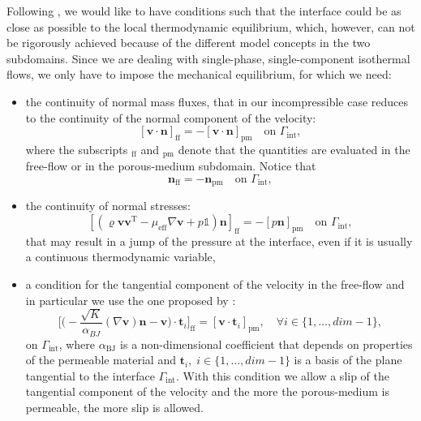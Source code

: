 Following \textcite{paper:mosthaf}, we would like to have conditions such that 
the interface could be as close as possible to the local thermodynamic 
equilibrium, which, however, can not be rigorously achieved because of the 
different model concepts in the two subdomains. Since we are dealing with 
single-phase, single-component isothermal flows, we only have to impose the 
mechanical equilibrium, for which we need:
\begin{itemize}
	\item the continuity of normal mass fluxes, that in our incompressible case 
	reduces to the continuity of the normal component of the velocity:
	\begin{equation} \label{eq:contmass}
		[\mathbf{v} \cdot \mathbf{n}]_\text{ff} = - [\mathbf{v} 
		\cdot \mathbf{n}]_\text{pm} \quad \text{on $\Gamma_\text{int}$},
	\end{equation}
	where the subscripts $_\text{ff}$ and $_\text{pm}$ denote that the 
	quantities are 
	evaluated in the free-flow or in the porous-medium subdomain. Notice that
	\begin{equation}
		\mathbf{n}_\text{ff} = -\mathbf{n}_\text{pm} \quad \text{on 
		$\Gamma_\text{int}$},
	\end{equation}
	\item the continuity of normal stresses:
	\begin{equation} \label{eq:coupnormalstress}
		[(\varrho \mathbf{v} \mathbf{v}^\mathrm{T} - \mu_\text{eff} \nabla 
		\mathbf{v} + p\mathbb{1}) 
		\mathbf{n}]_\text{ff} = 
		- [p\mathbf{n}]_\text{pm} \quad \text{on $\Gamma_\text{int}$},
	\end{equation}
	that may result in a jump of the pressure at the interface, even if it is 
	usually a continuous thermodynamic variable,
	\item a condition for the tangential component of the velocity in the 
	free-flow and in particular we use the one proposed by \textcite{inter:bj}:
	\begin{equation}
		\bigg[ \bigg( -\frac{\sqrt{K}}{\alpha_{BJ}} (\nabla \mathbf{v}) 
		\mathbf{n} - \mathbf{v} \bigg) \cdot \mathbf{t}_i \bigg]_\text{ff} = 
		[\mathbf{v} \cdot \mathbf{t}_i]_\text{pm}, \quad \forall i \in \{1, 
		\dots, dim - 1\},
	\end{equation}
	on $\Gamma_\text{int}$, where $\alpha_\text{BJ}$ is a non-dimensional 
	coefficient that depends on 
	properties of the permeable material and $\mathbf{t}_i, \; 
	i \in \{1, \dots, dim-1\}$ is a basis of the plane tangential to the 
	interface $\Gamma_\text{int}$. With this condition we allow a slip of the 
	tangential component of the velocity and the more the porous-medium is 
	permeable, the more slip is allowed.
	

\end{itemize}
